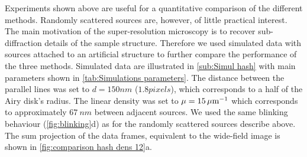 %	
%
%	
\clearpage
Experiments shown above are useful for a quantitative comparison of the different methods. Randomly scattered sources are, however, of little practical interest. The main motivation of the super-resolution microscopy is to recover sub-diffraction details of the sample structure. Therefore we used simulated data with sources attached to an artificial structure to further compare the performance of the three methods. Simulated data are illustrated in \autoref{sub:Simul hash} with main parameters shown in \autoref{tab:Simulations parameters}. The distance between the parallel lines was set to $d=150\unit{nm}$ ($1.8 \unit{pixels}$), which corresponds to a half of the Airy disk's radius. The linear density was set to $\mu = 15\, \mathrm{\mu m}^{-1}$ which corresponds to approximately $67\ \unit{nm}$ between adjacent sources. We used the same blinking behaviour (\autoref{fig:blinking}d) as for the randomly scattered sources describe above. The sum projection of the data frames, equivalent to the wide-field image is shown in \autoref{fig:comparison hash dens 12}a.
